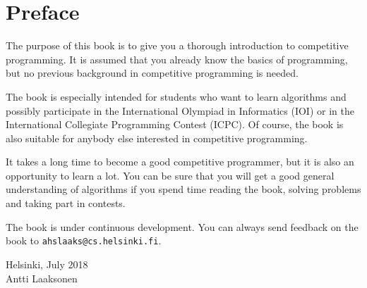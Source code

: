 \chapter*{Preface}

The purpose of this book is to give you
a thorough introduction to competitive programming.
It is assumed that you already
know the basics of programming, but no previous
background in competitive programming is needed.

The book is especially intended for
students who want to learn algorithms and
possibly participate in
the International Olympiad in Informatics (IOI) or
in the International Collegiate Programming Contest (ICPC).
Of course, the book is also suitable for 
anybody else interested in competitive programming.

It takes a long time to become a good competitive
programmer, but it is also an opportunity to learn a lot.
You can be sure that you will get
a good general understanding of algorithms
if you spend time reading the book,
solving problems and taking part in contests.

The book is under continuous development.
You can always send feedback on the book to
\texttt{ahslaaks@cs.helsinki.fi}.

\begin{flushright}
Helsinki, July 2018 \\
Antti Laaksonen
\end{flushright}
